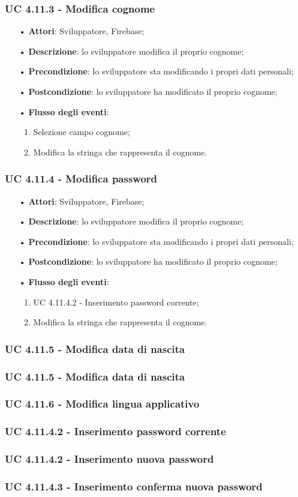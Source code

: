 \subsubsection{UC 4.11.3 - Modifica cognome}
\begin{itemize}
	\item[•]\textbf{Attori}: Sviluppatore, Firebase;
	\item[•]\textbf{Descrizione}: lo sviluppatore modifica il proprio cognome;
	\item[•]\textbf{Precondizione}: lo sviluppatore sta modificando i propri dati personali;
	\item[•]\textbf{Postcondizione}: lo sviluppatore ha modificato il proprio cognome; 
	\item[•]\textbf{Flusso degli eventi}: 
	\begin{enumerate}
		\item Selezione campo cognome;
		\item Modifica la stringa che rappresenta il cognome.
	\end{enumerate}
\end{itemize}
\subsubsection{UC 4.11.4 - Modifica password}
\begin{itemize}
	\item[•]\textbf{Attori}: Sviluppatore, Firebase;
	\item[•]\textbf{Descrizione}: lo sviluppatore modifica il proprio cognome;
	\item[•]\textbf{Precondizione}: lo sviluppatore sta modificando i propri dati personali;
	\item[•]\textbf{Postcondizione}: lo sviluppatore ha modificato il proprio cognome; 
	\item[•]\textbf{Flusso degli eventi}: 
	\begin{enumerate}
		\item UC 4.11.4.2 - Inserimento password corrente;
		\item Modifica la stringa che rappresenta il cognome.
	\end{enumerate}
\end{itemize}
\subsubsection{UC 4.11.5 - Modifica data di nascita}
\subsubsection{UC 4.11.5 - Modifica data di nascita}
\subsubsection{UC 4.11.6 - Modifica lingua applicativo}
\subsubsection{UC 4.11.4.2 - Inserimento password corrente}
\subsubsection{UC 4.11.4.2 - Inserimento nuova password}
\subsubsection{UC 4.11.4.3 - Inserimento conferma nuova password}